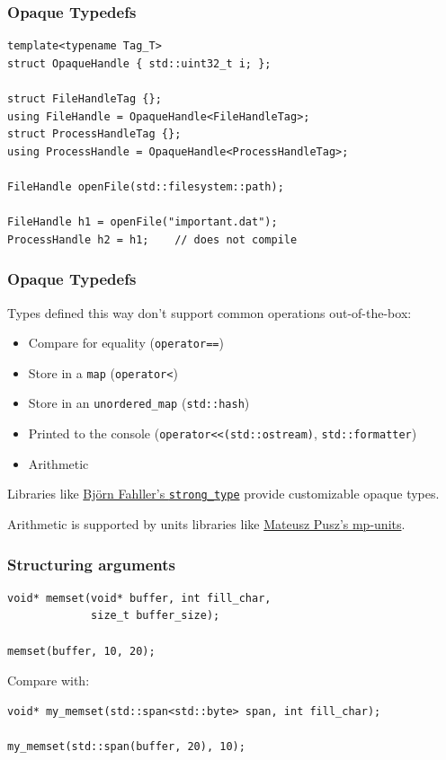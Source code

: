 \documentclass[aspectratio=169]{beamer}
\begin{document}
\begin{frame}[fragile]
  \frametitle{Opaque Typedefs}
  
  \begin{lstlisting}[style=cpp20]
template<typename Tag_T>
struct OpaqueHandle { std::uint32_t i; };

struct FileHandleTag {};
using FileHandle = OpaqueHandle<FileHandleTag>;
struct ProcessHandleTag {};
using ProcessHandle = OpaqueHandle<ProcessHandleTag>;

FileHandle openFile(std::filesystem::path);

FileHandle h1 = openFile("important.dat");
ProcessHandle h2 = h1;    // does not compile
  \end{lstlisting}
\end{frame}

\begin{frame}[fragile]
  \frametitle{Opaque Typedefs}
  
  Types defined this way don't support common operations out-of-the-box:
  \begin{itemize}
  \item Compare for equality (\texttt{operator==})
  \item Store in a \texttt{map} (\texttt{operator<})
  \item Store in an \texttt{unordered\_map} (\texttt{std::hash})
  \item Printed to the console (\texttt{operator<<(std::ostream)}, \texttt{std::formatter})
  \item Arithmetic
  \end{itemize}
  
  Libraries like \href{https://github.com/rollbear/strong_type}{Björn Fahller's \texttt{strong\_type}} provide customizable opaque types.
  
  Arithmetic is supported by units libraries like \href{https://github.com/mpusz/units}{Mateusz Pusz's mp-units}.
\end{frame}

\begin{frame}[fragile]
  \frametitle{Structuring arguments}
  
  \begin{lstlisting}[style=cpp20]
void* memset(void* buffer, int fill_char,
             size_t buffer_size);
  
memset(buffer, 10, 20);
  \end{lstlisting}

  \vspace{10pt}
  Compare with:

  \begin{lstlisting}[style=cpp20]
void* my_memset(std::span<std::byte> span, int fill_char);
  
my_memset(std::span(buffer, 20), 10);
  \end{lstlisting}
\end{frame}
\end{document}
